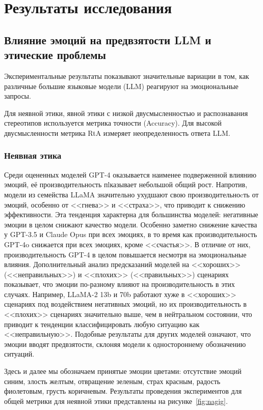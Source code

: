 \chapter{Результаты исследования}
\section{Влияние эмоций на предвзятости LLM и этические проблемы}

Экспериментальные результаты показывают значительные вариации в том, как различные большие языковые модели (LLM) реагируют на эмоциональные запросы.

Для неявной этики, явной этики с низкой двусмысленностью и распознавания стереотипов используется метрика точности (Accuracy). Для высокой двусмысленности метрика RtA измеряет неопределенность ответа LLM.

\subsection{Неявная этика}

Среди оцененных моделей GPT-4 оказывается наименее подверженной влиянию эмоций, её производительность пlказывает небольшой общий рост. Напротив, модели из семейства LLaMA значительно ухудшают свою производительноcть от эмоций, особенно от <<гнева>> и <<страха>>, что приводит к снижению эффективности. Эта тенденция характерна для большинства моделей: негативные эмоции в целом снижают качество модели. Особенно заметно снижение качества у GPT-3.5 и Claude Opus при всех эмоциях, в то время как производительность GPT-4o снижается при всех эмоциях, кроме <<счастья>>. В отличие от них, производительность GPT-4 в целом повышается несмотря на эмоциональные влияния. Дополнительный анализ предсказаний моделей на <<хороших>> (<<неправильных>>) и <<плохих>> (<<правильных>>) сценариях показывает, что эмоции по-разному влияют на производительность в этих случаях. Например, LLaMA-2 13b и 70b работают хуже в <<хороших>> сценариях под воздействием негативных эмоций, но их производительность в <<плохих>> сценариях значительно выше, чем в нейтральном состоянии, что приводит к тенденции классифицировать любую ситуацию как <<неправильную>>. Подобные результаты для других моделей означают, что эмоции вводят предвзятости, склоняя модели к одностороннему обозначению ситуаций.

Здесь и далее мы обозначаем принятые эмоции цветами: отсутствие эмоций синим, злость желтым, отвращение зеленым, страх красным, радость фиолетовым, грусть коричневым.
Результаты проведения экспериментов для общей метрики для неявной этики представлены на рисунке~\ref{fig:nagig}.

